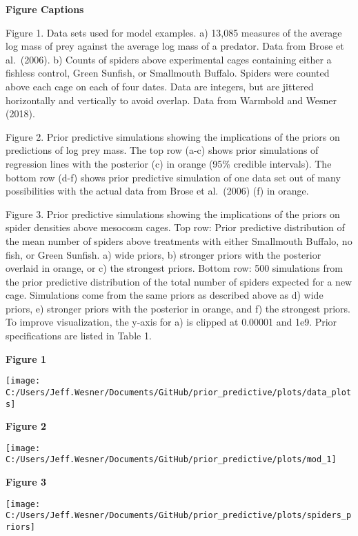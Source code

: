 \documentclass[
  12pt,
]{article}
\begin{document}
\textbf{Figure Captions}

Figure 1. Data sets used for model examples. a) 13,085 measures of the
average log mass of prey against the average log mass of a predator.
Data from Brose et al.~(2006). b) Counts of spiders above experimental
cages containing either a fishless control, Green Sunfish, or Smallmouth
Buffalo. Spiders were counted above each cage on each of four dates.
Data are integers, but are jittered horizontally and vertically to avoid
overlap. Data from Warmbold and Wesner (2018).

Figure 2. Prior predictive simulations showing the implications of the
priors on predictions of log prey mass. The top row (a-c) shows prior
simulations of regression lines with the posterior (c) in orange (95\%
credible intervals). The bottom row (d-f) shows prior predictive
simulation of one data set out of many possibilities with the actual
data from Brose et al.~(2006) (f) in orange.

Figure 3. Prior predictive simulations showing the implications of the
priors on spider densities above mesocosm cages. Top row: Prior
predictive distribution of the mean number of spiders above treatments
with either Smallmouth Buffalo, no fish, or Green Sunfish. a) wide
priors, b) stronger priors with the posterior overlaid in orange, or c)
the strongest priors. Bottom row: 500 simulations from the prior
predictive distribution of the total number of spiders expected for a
new cage. Simulations come from the same priors as described above as d)
wide priors, e) stronger priors with the posterior in orange, and f) the
strongest priors. To improve visualization, the y-axis for a) is clipped
at 0.00001 and 1e9. Prior specifications are listed in Table 1.

\newpage

\textbf{Figure 1}

\texttt{[image: C:/Users/Jeff.Wesner/Documents/GitHub/prior\_predictive/plots/data\_plots]}

\newpage

\textbf{Figure 2}

\texttt{[image: C:/Users/Jeff.Wesner/Documents/GitHub/prior\_predictive/plots/mod\_1]}

\newpage

\textbf{Figure 3}

\texttt{[image: C:/Users/Jeff.Wesner/Documents/GitHub/prior\_predictive/plots/spiders\_priors]}

\newpage
\end{document}
